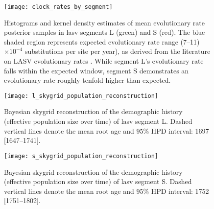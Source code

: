 \begin{figure}[ht]
  \centering
  \medskip
  \texttt{[image: clock\_rates\_by\_segment]}
  \caption[LASV clock rates by segment]{Histograms and kernel density estimates of mean evolutionary rate posterior samples in \gls{lasv} segments L (green) and S (red). The blue shaded region represents expected evolutionary rate range (7--11)$\times10^{-4}$ substitutions per site per year), as derived from the literature on LASV evolutionary rates \cite{andersen2015clinical, fichet2016spatial}. While segment L's evolutionary rate falls within the expected window, segment S demonstrates an evolutionary rate roughly tenfold higher than expected.}
  \label{fig:lassa_clock_rates}
\end{figure}

\begin{figure}[ht]
  \centering
  \medskip
  \texttt{[image: l\_skygrid\_population\_reconstruction]}
  \caption[Demographic history of Lassa's L segment]{Bayesian skygrid reconstruction of the demographic history (effective population size over time) of \gls{lasv} segment L. Dashed vertical lines denote the mean root age and 95\% HPD interval: 1697 [1647--1741].}
  \label{fig:l_skygrid}
\end{figure}

\begin{figure}[ht]
  \centering
  \medskip
  \texttt{[image: s\_skygrid\_population\_reconstruction]}
  \caption[Demographic history of Lassa's S segment]{Bayesian skygrid reconstruction of the demographic history (effective population size over time) of \gls{lasv} segment S. Dashed vertical lines denote the mean root age and 95\% HPD interval: 1752 [1751--1802].}
  \label{fig:s_skygrid}
\end{figure}


\cleardoublepage

